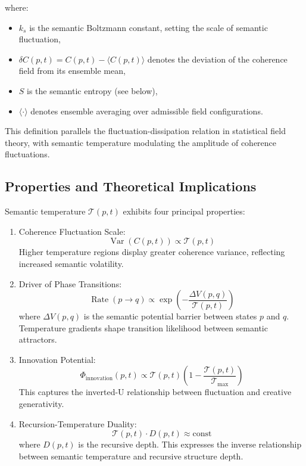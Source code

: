 where:
\begin{itemize}
    \item \(k_s\) is the semantic Boltzmann constant, setting the scale of semantic fluctuation,
    \item \(\delta C(p,t) = C(p,t) - \langle C(p,t) \rangle\) denotes the deviation of the coherence field from its ensemble mean,
    \item \(S\) is the semantic entropy (see below),
    \item \(\langle \cdot \rangle\) denotes ensemble averaging over admissible field configurations.
\end{itemize}

This definition parallels the fluctuation-dissipation relation in statistical field theory, with semantic temperature modulating the amplitude of coherence fluctuations.

\subsection{Properties and Theoretical Implications}

Semantic temperature \(\mathcal{T}(p,t)\) exhibits four principal properties:

\begin{enumerate}
    \item Coherence Fluctuation Scale:
    \begin{equation}
    \operatorname{Var}(C(p,t)) \propto \mathcal{T}(p,t)
    \end{equation}
    Higher temperature regions display greater coherence variance, reflecting increased semantic volatility.

    \item Driver of Phase Transitions:
    \begin{equation}
    \operatorname{Rate}(p \to q) \propto \exp\left(-\frac{\Delta V(p,q)}{\mathcal{T}(p,t)}\right)
    \end{equation}
    where \(\Delta V(p,q)\) is the semantic potential barrier between states \(p\) and \(q\). Temperature gradients shape transition likelihood between semantic attractors.

    \item Innovation Potential:
    \begin{equation}
    \Phi_{\text{innovation}}(p,t) \propto \mathcal{T}(p,t) \left(1 - \frac{\mathcal{T}(p,t)}{\mathcal{T}_{\max}}\right)
    \end{equation}
    This captures the inverted-U relationship between fluctuation and creative generativity.

    \item Recursion-Temperature Duality:
    \begin{equation}
    \mathcal{T}(p,t) \cdot D(p,t) \approx \text{const}
    \end{equation}
    where \(D(p,t)\) is the recursive depth. This expresses the inverse relationship between semantic temperature and recursive structure depth.
\end{enumerate}

